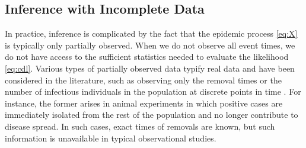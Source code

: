 \documentclass[11pt]{article}
\begin{document}
	


	
	\subsection{Inference with Incomplete Data}
	\label{sec:iid}
	
	In practice, inference is complicated by the fact that the epidemic process \eqref{eq:X} is typically only partially observed. When we do not observe all event times, we do not have access to the sufficient statistics needed to evaluate the likelihood \eqref{eq:cdl}. Various types of partially observed data typify real data and have been considered in the literature, such as observing only the removal times \cite{Gibson.1998, ONeill.1999} or the number of infectious individuals in the population at discrete points in time \cite{Fintzi.2017}. For instance, the former arises in animal experiments in which positive cases are immediately isolated from the rest of the population and no longer contribute to disease spread. In such cases, exact times of removals are known, but such information is unavailable in typical observational studies.
	
\end{document}
